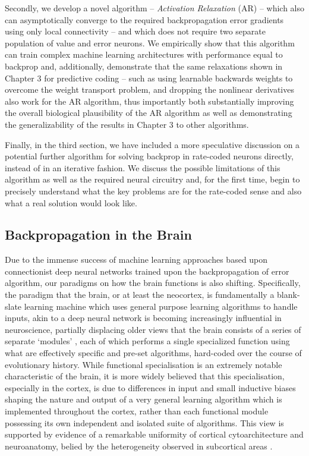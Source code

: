 Secondly, we develop a novel algorithm -- \emph{Activation Relaxation} (AR) -- which also can asymptotically converge to the required backpropagation error gradients using only local connectivity -- and which does not require two separate population of value and error neurons. We empirically show that this algorithm can train complex machine learning architectures with performance equal to backprop and, additionally, demonstrate that the same relaxations shown in Chapter 3 for predictive coding -- such as using learnable backwards weights to overcome the weight transport problem, and dropping the nonlinear derivatives also work for the AR algorithm, thus importantly both substantially improving the overall biological plausibility of the AR algorithm as well as demonstrating the generalizability of the results in Chapter 3 to other algorithms.

Finally, in the third section, we have included a more speculative discussion on a potential further algorithm for solving backprop in rate-coded neurons directly, instead of in an iterative fashion. We discuss the possible limitations of this algorithm as well as the required neural circuitry and, for the first time, begin to precisely understand what the key problems are for the rate-coded sense and also what a real solution would look like.

\subsection{Backpropagation in the Brain}

Due to the immense success of machine learning approaches based upon connectionist deep neural networks trained upon the backpropagation of error algorithm, our paradigms on how the brain functions is also shifting. Specifically, the paradigm that the brain, or at least the neocortex, is fundamentally a blank-slate learning machine which uses general purpose learning algorithms to handle inputs, akin to a deep neural network is becoming increasingly influential in neuroscience, partially displacing older views that the brain consists of a series of separate `modules' \citep{fodor1983modularity,pinker2003language}, each of which performs a single specialized function using what are effectively specific and pre-set algorithms, hard-coded over the course of evolutionary history. While functional specialisation is an extremely notable characteristic of the brain, it is more widely believed that this specialisation, especially in the cortex, is due to differences in input and small inductive biases shaping the nature and output of a very general learning algorithm which is implemented throughout the cortex, rather than each functional module possessing its own independent and isolated suite of algorithms. This view is supported by evidence of a remarkable uniformity of cortical cytoarchitecture and neuroanatomy, belied by the heterogeneity observed in subcortical areas \citep{bear2020neuroscience}.

